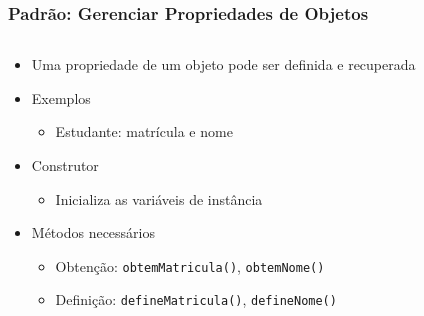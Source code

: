 \documentclass[xcolor={dvipsnames,table},aspectratio=169]{beamer}
\begin{document}
\begin{frame}[fragile]\frametitle{Padrão: Gerenciar Propriedades de Objetos}
\begin{columns}[T]
	\begin{column}{0.5\linewidth}
\begin{itemize}
	\item Uma propriedade de um objeto pode ser definida e recuperada
	\item Exemplos
	\begin{itemize}
		\item Estudante: matrícula e nome
	\end{itemize}
	\item Construtor
	\begin{itemize}
		\item Inicializa as variáveis de instância
	\end{itemize}
	\item Métodos necessários
	\begin{itemize}
		\item Obtenção: \texttt{obtemMatricula()}, \texttt{obtemNome()}
		\item Definição: \texttt{defineMatricula()}, \texttt{defineNome()}
	\end{itemize}
\end{itemize}
	\end{column}
	\begin{column}{0.5\linewidth}
{\tiny\inputminted[bgcolor=cyan!10]{java}{src/Estudante.java}}
	\end{column}
\end{columns}
\end{frame}
\end{document}
